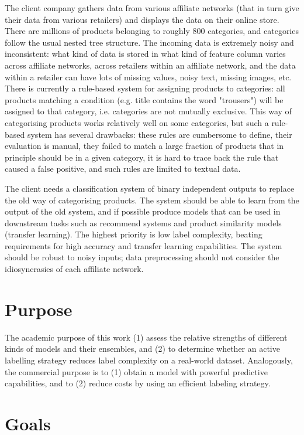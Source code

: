 The client company gathers data from various affiliate networks (that in turn give their data from various retailers) and displays the data on their online store.
There are millions of products belonging to roughly 800 categories, and categories follow the usual nested tree structure.
The incoming data is extremely noisy and inconsistent: what kind of data is stored in what kind of feature column varies across affiliate networks, across retailers within an affiliate network, and the data within a retailer can have lots of missing values, noisy text, missing images, etc.
There is currently a rule-based system for assigning products to categories: all products matching a condition (e.g. title contains the word "trousers") will be assigned to that category, i.e. categories are not mutually exclusive.
This way of categorising products works relatively well on some categories, but such a rule-based system has several drawbacks: these rules are cumbersome to define, their evaluation is manual, they failed to match a large fraction of products that in principle should be in a given category, it is hard to trace back the rule that caused a false positive, and such rules are limited to textual data.

The client needs a classification system of binary independent outputs to replace the old way of categorising products.
The system should be able to learn from the output of the old system, and if possible produce models that can be used in downstream tasks such as recommend systems and product similarity models (transfer learning).
The highest priority is low label complexity, beating requirements for high accuracy and transfer learning capabilities.
The system should be robust to  noisy inputs; data preprocessing should not consider the idiosyncrasies of each affiliate network.

\section{Purpose}

The academic purpose of this work (1) assess the relative strengths of different kinds of models and their ensembles, and (2) to determine whether an active labelling strategy reduces label complexity on a real-world dataset. Analogously, the commercial purpose is to (1) obtain a model with powerful predictive capabilities, and to (2) reduce costs by using an efficient labeling strategy.

\section{Goals}


